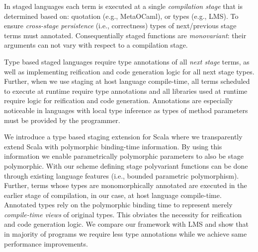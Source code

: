 In staged languages each term is executed at a single \emph{compilation stage}
 that is determined based on: quotation (e.g., MetaOCaml), or types (e.g., LMS).
 To ensure \emph{cross-stage persistence} (i.e., correctness) types of next/previous
 stage terms must annotated. Consequentially staged functions are \emph{monovariant}:
 their arguments can not vary with respect to a compilation stage.

Type based staged languages require type annotations of all \emph{next stage}
 terms, as well as implementing reification and code generation logic for all
 next stage types. Further, when we use staging at host language compile-time,
 all terms scheduled to execute at runtime require type annotations and all
 libraries used at runtime require logic for reification and code generation.
 Annotations are especially noticeable in languages with local type
 inference as types of method parameters must be provided by the programmer.

We introduce a type based staging extension for Scala where we transparently
 extend Scala with polymorphic binding-time information. By using this information
 we enable parametrically polymorphic parameters to also be stage polymorphic.
 With our scheme defining stage polyvariant functions can be done through
 existing language features (i.e., bounded parametric polymorphism).  Further,
 terms whose types are monomorphically annotated are executed in the earlier
 stage of compilation, in our case, at host language compile-time. Annotated
 types rely on the polymorphic binding time to represent merely \emph{\mbox
 {compile-time} views} of original types. This obviates the necessity for
 reification and code generation logic. We compare our framework with LMS and
 show that in  majority of programs we require less type annotations while we
 achieve same  performance  improvements.
